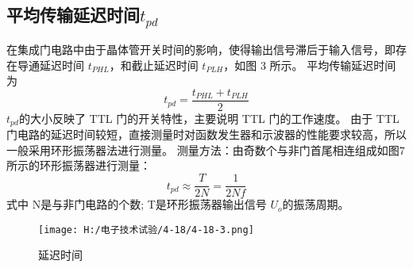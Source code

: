 \documentclass{article}
\begin{document}
\subsection{平均传输延迟时间$t_{pd}$}
在集成门电路中由于晶体管开关时间的影响，使得输出信号滞后于输入信号，即存在导通延迟时间 $t_{PHL}$，和截止延迟时间 $t_{PLH}$，如图 3 所示。
平均传输延迟时间为
\[t_{pd}=\frac{t_{PHL}+t_{PLH}}{2}\]
$t_{pd}$的大小反映了 TTL 门的开关特性，主要说明 TTL 门的工作速度。
由于 TTL 门电路的延迟时间较短，直接测量时对函数发生器和示波器的性能要求较高，所以一般采用环形振荡器法进行测量。
测量方法：由奇数个与非门首尾相连组成如图7所示的环形振荡器进行测量：
\[t_{pd}\approx \frac{T}{2N}=\frac{1}{2Nf} \]
式中 N是与非门电路的个数;
T是环形振荡器输出信号 $U_o$的振荡周期。 
\begin{figure}[h]
    \centering
    \texttt{[image: H:/电子技术试验/4-18/4-18-3.png]}
    \caption{延迟时间} \label{fig:aa}
\end{figure}
\end{document}
